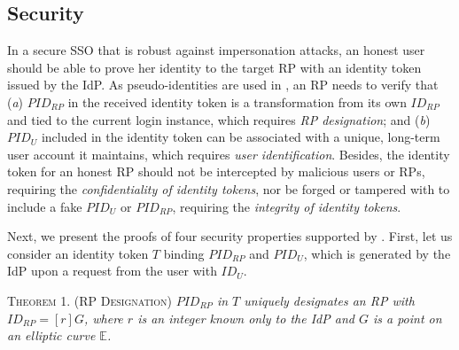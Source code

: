 \subsection{Security}
\label{analysis-security}

In a secure SSO that is robust against impersonation attacks, an honest user should be able to prove her identity to the target RP with an identity token issued by the IdP. As pseudo-identities are used in \usso, an RP needs to verify that ({\em a}) $PID_{RP}$ in the received identity token is a transformation from its own $ID_{RP}$ and tied to the current login instance, which requires {\em RP designation}; and ({\em b}) $PID_U$ included in the identity token can be associated with a unique, long-term user account it maintains, which requires {\em user identification}. Besides, the identity token for an honest RP should not be intercepted by malicious users or RPs, requiring the {\em confidentiality of identity tokens}, nor be forged or tampered with to include a fake $PID_U$ or $PID_{RP}$, requiring the {\em integrity of identity tokens}.

Next, we present the proofs of four security properties supported by \usso. First, let us consider an identity token $T$ binding $PID_{RP}$ and $PID_U$, which is generated by the IdP upon a request from the user with $ID_U$.

\vspace{1mm}
\noindent\textsc{Theorem 1. (RP Designation)} {\em $PID_{RP}$ in $T$ uniquely designates an RP with $ID_{RP} = [r]G$, where $r$ is an integer known only to the IdP and $G$ is a point on an elliptic curve $\mathbb{E}$.}

